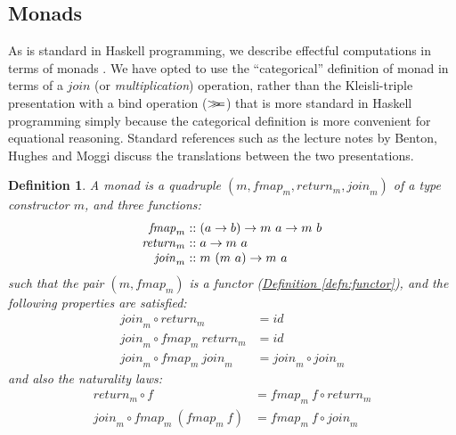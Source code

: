 \documentclass{jfp1}
\newcommand{\mbind}{\mathrel{>\kern-0.45em>\kern-0.45em=}}
\newtheorem{definition}{Definition}
\newcommand{\defref}[1]{\hyperref[#1]{Definition \ref*{#1}}}
\begin{document}
\subsection{Monads}

As is standard in Haskell programming, we describe effectful
computations in terms of monads \cite{moggi91notions,
  peytonjones93imperative}. We have opted to use the ``categorical''
definition of monad in terms of a $\mathit{join}$ (or
\emph{multiplication}) operation, rather than the Kleisli-triple
presentation with a bind operation ($\mbind$) that is more standard in
Haskell programming simply because the categorical definition is more
convenient for equational reasoning. Standard references such as the
lecture notes by Benton, Hughes and Moggi \cite{benton00monads}
discuss the translations between the two presentations.

\begin{definition}\label{defn:monad}
  A monad is a quadruple $(m, \mathit{fmap}_m, \mathit{return}_m,
  \mathit{join}_m)$ of a type constructor $m$, and three functions:
  \begin{displaymath}
    \begin{array}{r@{\hspace{0.3em}}c@{\hspace{0.3em}}l}
      \mathit{fmap}_m   & :: & (a \to b) \to m~a \to m~b \\
      \mathit{return}_m & :: & a \to m~a \\
      \mathit{join}_m   & :: & m~(m~a) \to m~a
    \end{array}
  \end{displaymath}
  such that the pair $(m, \mathit{fmap}_m)$ is a functor
  (\defref{defn:functor}), and the following properties are satisfied:
  \begin{align}
    \label{eq:monad-join-return}
    \mathit{join}_m \circ \mathit{return}_m & = \mathit{id} \\
    \label{eq:monad-join-fmap-return}
    \mathit{join}_m \circ \mathit{fmap}_m~\mathit{return}_m & = \mathit{id} \\
    \label{eq:monad-join-join}
    \mathit{join}_m \circ \mathit{fmap}_m~\mathit{join}_m & = \mathit{join}_m \circ \mathit{join}_m
  \end{align}
  and also the naturality laws:
  \begin{align}
    \label{eq:monad-return-natural}
    \mathit{return}_m \circ f & = \mathit{fmap}_m~f \circ \mathit{return}_m \\
    \label{eq:monad-join-natural}
    \mathit{join}_m \circ \mathit{fmap}_m~(\mathit{fmap}_m~f) & = \mathit{fmap}_m~f \circ \mathit{join}_m
  \end{align}
\end{definition}
\end{document}
